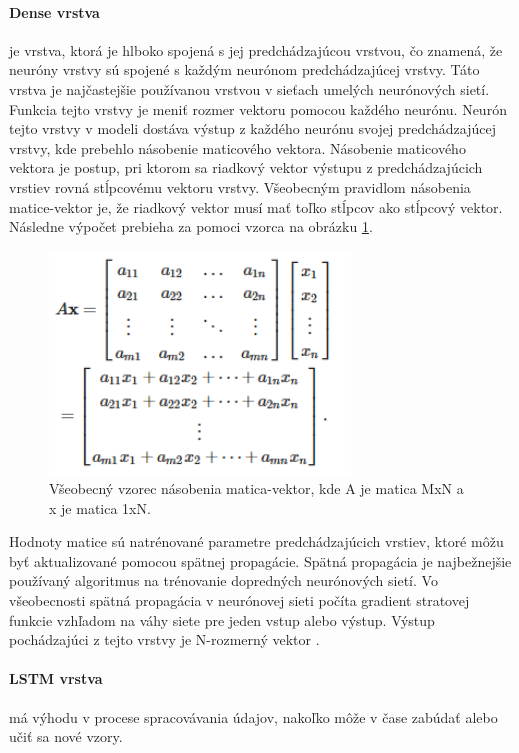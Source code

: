 \paragraph{Dense vrstva} je vrstva, ktorá je hlboko spojená s jej predchádzajúcou vrstvou, čo znamená, že neuróny vrstvy sú spojené s každým neurónom predchádzajúcej vrstvy. Táto vrstva je najčastejšie používanou vrstvou v sieťach umelých neurónových sietí. Funkcia tejto vrstvy je meniť rozmer vektoru pomocou každého neurónu.
Neurón tejto vrstvy v modeli dostáva výstup z každého neurónu svojej predchádzajúcej vrstvy, kde prebehlo násobenie maticového vektora. Násobenie maticového vektora je postup, pri ktorom sa riadkový vektor výstupu z predchádzajúcich vrstiev rovná stĺpcovému vektoru vrstvy. Všeobecným pravidlom násobenia matice-vektor je, že riadkový vektor musí mať toľko stĺpcov ako stĺpcový vektor. Následne výpočet prebieha za pomoci vzorca na obrázku \ref{maticavektor}.

\begin{figure}[!htbp]
  \centering
  \includegraphics[width=8cm]{img/dense.png}
  \caption{Všeobecný vzorec násobenia matica-vektor, kde A je matica MxN a x je matica 1xN.}
  \label{maticavektor}
\end{figure}

Hodnoty matice sú natrénované parametre predchádzajúcich vrstiev, ktoré môžu byť aktualizované pomocou spätnej propagácie. Spätná propagácia je najbežnejšie používaný algoritmus na trénovanie dopredných neurónových sietí. Vo všeobecnosti spätná propagácia v neurónovej sieti počíta gradient stratovej funkcie vzhľadom na váhy siete pre jeden vstup alebo výstup. Výstup pochádzajúci z tejto vrstvy je N-rozmerný vektor \cite{dense}.

\paragraph{LSTM vrstva} má výhodu v procese spracovávania údajov, nakoľko môže v čase zabúdať alebo učiť sa nové vzory. 

